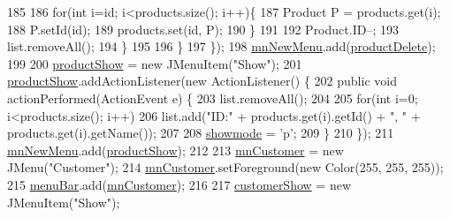 \begin{DoxyCode}
185                     
186                     \textcolor{keywordflow}{for}(\textcolor{keywordtype}{int} i=\textcolor{keywordtype}{id}; i<products.size(); i++)\{
187                         Product P = products.get(i);
188                         P.setId(\textcolor{keywordtype}{id});
189                         products.set(\textcolor{keywordtype}{id}, P);
190                     \}
191                     
192                     Product.ID--;
193                     list.removeAll();
194                 \}
195                 
196             \}
197         \});
198         \hyperlink{classpkg_1_1_management_u_i_a02082701769fb188544b2211ebc5f759}{mnNewMenu}.add(\hyperlink{classpkg_1_1_management_u_i_a035f7669304affd98f4304a8639ce4e8}{productDelete});
199         
200         \hyperlink{classpkg_1_1_management_u_i_a46a473eb18422c9f6011fb4d773f65c5}{productShow} = \textcolor{keyword}{new} JMenuItem(\textcolor{stringliteral}{"Show"});
201         \hyperlink{classpkg_1_1_management_u_i_a46a473eb18422c9f6011fb4d773f65c5}{productShow}.addActionListener(\textcolor{keyword}{new} ActionListener() \{
202             \textcolor{keyword}{public} \textcolor{keywordtype}{void} actionPerformed(ActionEvent e) \{
203                 list.removeAll();
204                 
205                 \textcolor{keywordflow}{for}(\textcolor{keywordtype}{int} i=0; i<products.size(); i++)
206                     list.add(\textcolor{stringliteral}{"ID:"} + products.get(i).getId() + \textcolor{stringliteral}{", "} + products.get(i).getName());
207                 
208                 \hyperlink{classpkg_1_1_management_u_i_a06db2befb99ab3b189caa39e736e2d0d}{showmode} = \textcolor{charliteral}{'p'};
209             \}
210         \});
211         \hyperlink{classpkg_1_1_management_u_i_a02082701769fb188544b2211ebc5f759}{mnNewMenu}.add(\hyperlink{classpkg_1_1_management_u_i_a46a473eb18422c9f6011fb4d773f65c5}{productShow});
212         
213         \hyperlink{classpkg_1_1_management_u_i_a0c7fb8ff1b3734316fe7bc49221a5814}{mnCustomer} = \textcolor{keyword}{new} JMenu(\textcolor{stringliteral}{"Customer"});
214         \hyperlink{classpkg_1_1_management_u_i_a0c7fb8ff1b3734316fe7bc49221a5814}{mnCustomer}.setForeground(\textcolor{keyword}{new} Color(255, 255, 255));
215         \hyperlink{classpkg_1_1_management_u_i_ace9ff91bcebb641b7363e764eae00310}{menuBar}.add(\hyperlink{classpkg_1_1_management_u_i_a0c7fb8ff1b3734316fe7bc49221a5814}{mnCustomer});
216         
217         \hyperlink{classpkg_1_1_management_u_i_ada892716bd590c607273c9a9b5353d03}{customerShow} = \textcolor{keyword}{new} JMenuItem(\textcolor{stringliteral}{"Show"});

\end{DoxyCode}
